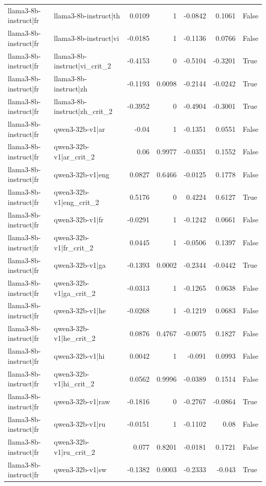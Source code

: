 \begin{table}
\begin{tabular}{l l r r r r l}
llama3-8b-instruct|fr & llama3-8b-instruct|th & 0.0109 & 1 & -0.0842 & 0.1061 & False \\
llama3-8b-instruct|fr & llama3-8b-instruct|vi & -0.0185 & 1 & -0.1136 & 0.0766 & False \\
llama3-8b-instruct|fr & llama3-8b-instruct|vi_crit_2 & -0.4153 & 0 & -0.5104 & -0.3201 & True \\
llama3-8b-instruct|fr & llama3-8b-instruct|zh & -0.1193 & 0.0098 & -0.2144 & -0.0242 & True \\
llama3-8b-instruct|fr & llama3-8b-instruct|zh_crit_2 & -0.3952 & 0 & -0.4904 & -0.3001 & True \\
llama3-8b-instruct|fr & qwen3-32b-v1|ar & -0.04 & 1 & -0.1351 & 0.0551 & False \\
llama3-8b-instruct|fr & qwen3-32b-v1|ar_crit_2 & 0.06 & 0.9977 & -0.0351 & 0.1552 & False \\
llama3-8b-instruct|fr & qwen3-32b-v1|eng & 0.0827 & 0.6466 & -0.0125 & 0.1778 & False \\
llama3-8b-instruct|fr & qwen3-32b-v1|eng_crit_2 & 0.5176 & 0 & 0.4224 & 0.6127 & True \\
llama3-8b-instruct|fr & qwen3-32b-v1|fr & -0.0291 & 1 & -0.1242 & 0.0661 & False \\
llama3-8b-instruct|fr & qwen3-32b-v1|fr_crit_2 & 0.0445 & 1 & -0.0506 & 0.1397 & False \\
llama3-8b-instruct|fr & qwen3-32b-v1|ga & -0.1393 & 0.0002 & -0.2344 & -0.0442 & True \\
llama3-8b-instruct|fr & qwen3-32b-v1|ga_crit_2 & -0.0313 & 1 & -0.1265 & 0.0638 & False \\
llama3-8b-instruct|fr & qwen3-32b-v1|he & -0.0268 & 1 & -0.1219 & 0.0683 & False \\
llama3-8b-instruct|fr & qwen3-32b-v1|he_crit_2 & 0.0876 & 0.4767 & -0.0075 & 0.1827 & False \\
llama3-8b-instruct|fr & qwen3-32b-v1|hi & 0.0042 & 1 & -0.091 & 0.0993 & False \\
llama3-8b-instruct|fr & qwen3-32b-v1|hi_crit_2 & 0.0562 & 0.9996 & -0.0389 & 0.1514 & False \\
llama3-8b-instruct|fr & qwen3-32b-v1|raw & -0.1816 & 0 & -0.2767 & -0.0864 & True \\
llama3-8b-instruct|fr & qwen3-32b-v1|ru & -0.0151 & 1 & -0.1102 & 0.08 & False \\
llama3-8b-instruct|fr & qwen3-32b-v1|ru_crit_2 & 0.077 & 0.8201 & -0.0181 & 0.1721 & False \\
llama3-8b-instruct|fr & qwen3-32b-v1|sw & -0.1382 & 0.0003 & -0.2333 & -0.043 & True \\

\end{tabular}
\end{table}
